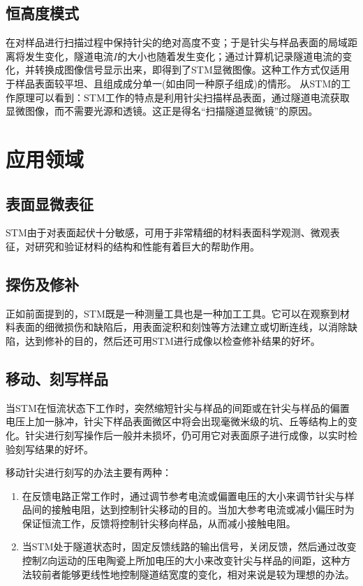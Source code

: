 \documentclass[12pt,a4paper]{ctexart}
\begin{document}
\subsection{恒高度模式}
在对样品进行扫描过程中保持针尖的绝对高度不变；于是针尖与样品表面的局域距离将发生变化，隧道电流$I$的大小也随着发生变化；通过计算机记录隧道电流的变化，并转换成图像信号显示出来，即得到了STM显微图像。这种工作方式仅适用于样品表面较平坦、且组成成分单一(如由同一种原子组成)的情形。 从STM的工作原理可以看到：STM工作的特点是利用针尖扫描样品表面，通过隧道电流获取显微图像，而不需要光源和透镜。这正是得名“扫描隧道显微镜”的原因。

\section{应用领域}
\subsection{表面显微表征}
STM由于对表面起伏十分敏感，可用于非常精细的材料表面科学观测、微观表征，对研究和验证材料的结构和性能有着巨大的帮助作用。
\subsection{探伤及修补}
正如前面提到的，STM既是一种测量工具也是一种加工工具。它可以在观察到材料表面的细微损伤和缺陷后，用表面淀积和刻蚀等方法建立或切断连线，以消除缺陷，达到修补的目的，然后还可用STM进行成像以检查修补结果的好坏。
\subsection{移动、刻写样品}
当STM在恒流状态下工作时，突然缩短针尖与样品的间距或在针尖与样品的偏置电压上加一脉冲，针尖下样品表面微区中将会出现毫微米级的坑、丘等结构上的变化。针尖进行刻写操作后一般并未损坏，仍可用它对表面原子进行成像，以实时检验刻写结果的好坏。

移动针尖进行刻写的办法主要有两种：
\begin{enumerate}
	\item 在反馈电路正常工作时，通过调节参考电流或偏置电压的大小来调节针尖与样品间的接触电阻，达到控制针尖移动的目的。当加大参考电流或减小偏压时为保证恒流工作，反馈将控制针尖移向样品，从而减小接触电阻。
	\item 当STM处于隧道状态时，固定反馈线路的输出信号，关闭反馈，然后通过改变控制Z向运动的压电陶瓷上所加电压的大小来改变针尖与样品的间距，这种方法较前者能够更线性地控制隧道结宽度的变化，相对来说是较为理想的办法。
\end{enumerate}
\end{document}
